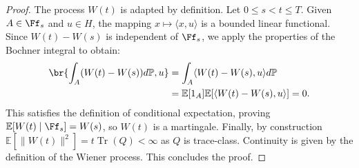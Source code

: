 \documentclass[
    a4paper,
    DIV=14,
    abstract=true,
    numbers=noenddot
]{scrartcl}
\begin{document}
\begin{proof}
    The process $W(t)$ is adapted by definition. Let $0 \leq s < t \leq T$. Given $A \in \Ff_s$ and $u \in H$, the mapping $x \mapsto \langle x, u \rangle$ is a bounded linear functional. Since $W(t) - W(s)$ is independent of $\Ff_s$, we apply the properties of the Bochner integral to obtain:
    \begin{align*}
        \br{ \int_A (W(t)-W(s)) d\mathbb{P}, u  }   &= \int_A \langle W(t)-W(s), u \rangle d\mathbb{P} \\
        &= \mathbb{E}[1_A] \mathbb{E}[\langle W(t)-W(s), u \rangle] = 0.
    \end{align*}
    This satisfies the definition of conditional expectation, proving $\mathbb{E}[W(t) \mid \Ff_s] = W(s)$, so $W(t)$ is a martingale. Finally, by construction $\mathbb{E}[\|W(t)\|^2] = t \operatorname{Tr}(Q)<\infty$ as $Q$ is trace-class. Continuity is given by the definition of the Wiener process. This concludes the proof.
\end{proof}

\end{document}
